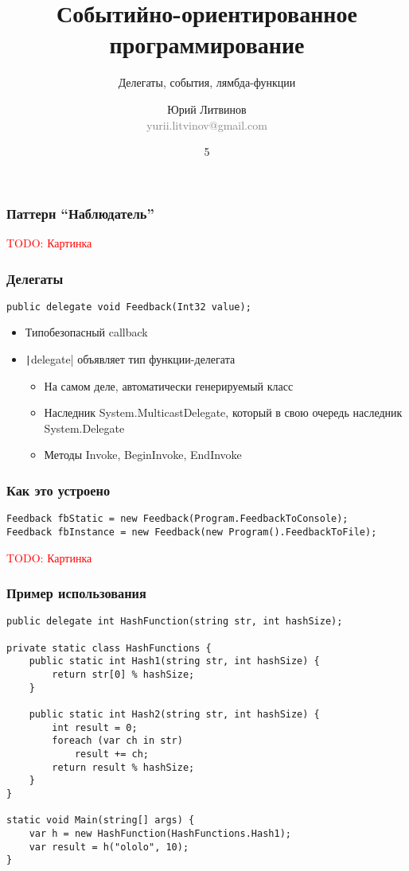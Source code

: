 \documentclass[xetex,mathserif,serif]{beamer}
\title{Событийно-ориентированное программирование}
\subtitle{Делегаты, события, лямбда-функции}
\author[Юрий Литвинов]{Юрий Литвинов\\\small{\textcolor{gray}{yurii.litvinov@gmail.com}}}
\date{5}
\newcommand{\todo}[1] {
	\begin{center}\textcolor{red}{TODO: #1}\end{center}
}
\begin{document}
	\frame{\titlepage}

	\begin{frame}
		\frametitle{Паттерн ``Наблюдатель''}
		\todo{Картинка}
	\end{frame}

	\begin{frame}[fragile]
		\frametitle{Делегаты}
		\begin{verbatim}
public delegate void Feedback(Int32 value);
		\end{verbatim}
		\begin{itemize}
			\item Типобезопасный callback
			\item \texttt|delegate| объявляет тип функции-делегата
			\begin{itemize}
				\item На самом деле, автоматически генерируемый класс
				\item Наследник System.MulticastDelegate, который в свою очередь наследник System.Delegate
				\item Методы Invoke, BeginInvoke, EndInvoke
			\end{itemize}
		\end{itemize}
	\end{frame}

	\begin{frame}[fragile]
		\frametitle{Как это устроено}
		\begin{verbatim}
Feedback fbStatic = new Feedback(Program.FeedbackToConsole);
Feedback fbInstance = new Feedback(new Program().FeedbackToFile);
		\end{verbatim}
		\todo{Картинка}
	\end{frame}

	\begin{frame}[fragile]
		\frametitle{Пример использования}
		\begin{scriptsize}
			\begin{verbatim}
public delegate int HashFunction(string str, int hashSize);

private static class HashFunctions {
    public static int Hash1(string str, int hashSize) {
        return str[0] % hashSize;
    }

    public static int Hash2(string str, int hashSize) {
        int result = 0;
        foreach (var ch in str)
            result += ch;
        return result % hashSize;
    }
}

static void Main(string[] args) {
    var h = new HashFunction(HashFunctions.Hash1);
    var result = h("ololo", 10);
}
			\end{verbatim}
		\end{scriptsize}
	\end{frame}
\end{document}
